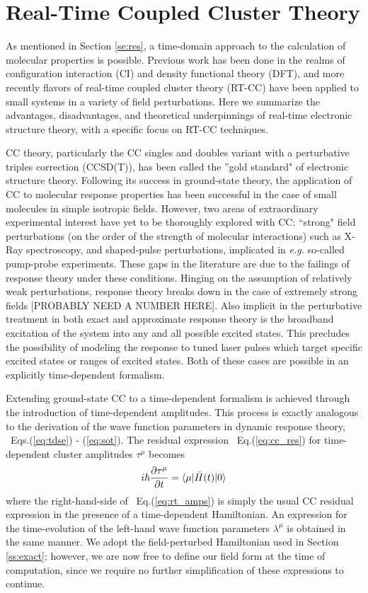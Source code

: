 \section{Real-Time Coupled Cluster Theory} \label{se:rtcc}
As mentioned in Section \ref{se:res}, a time-domain approach to the calculation of molecular properties
is possible. Previous work has been done in the realms of configuration interaction (CI) and density
functional theory (DFT), and more recently flavors of real-time coupled cluster theory (RT-CC) have been
applied to small systems in a variety of field perturbations. Here we summarize the advantages,
disadvantages, and theoretical underpinnings of real-time electronic structure theory, with a 
specific focus on RT-CC techniques.

CC theory, particularly the CC singles and doubles variant with a perturbative triples correction (CCSD(T)),
has been called the ''gold standard" of electronic structure theory. Following its success in ground-state 
theory, the application of CC to molecular response properties has been successful in the case of small 
molecules in simple isotropic fields.
However, two areas of extraordinary experimental interest have yet to be thoroughly explored with CC: 
``strong" field perturbations (on the order of the strength of molecular interactions) such as X-Ray
spectroscopy, and shaped-pulse perturbations, implicated in \textit{e.g.} so-called pump-probe experiments.
These gaps in the literature are due to the failings of response theory under these conditions. 
Hinging on the assumption of relatively weak perturbations, response theory breaks down in the case 
of extremely strong fields [PROBABLY NEED A NUMBER HERE]. Also implicit in the perturbative treatment
in both exact and approximate response theory is the broadband excitation of the system into any and 
all possible excited states. This precludes the possibility of modeling the response to tuned laser pulses
which target specific excited states or ranges of excited states. Both of these cases are possible in an
explicitly time-dependent formalism.

Extending ground-state CC to a time-dependent formalism is achieved through the introduction of 
time-dependent amplitudes. This process is exactly analogous to the derivation of the wave function
parameters in dynamic response theory, ~Eqs.(\ref{eq:tdse}) - (\ref{eq:sot}). The residual expression
~Eq.(\ref{eq:cc_res}) for time-dependent cluster amplitudes $\tau^\mu$ becomes
\begin{equation} \label{eq:rt_amps}
    i\hbar\frac{\partial\tau^\mu}{\partial t} = \langle\mu |\bar H(t)| 0 \rangle
\end{equation}
where the right-hand-side of ~Eq.(\ref{eq:rt_amps}) is simply the usual CC residual expression in the
presence of a time-dependent Hamiltonian. An expression for the time-evolution of the left-hand wave 
function parameters $\lambda^\mu$ is obtained in the same manner.
We adopt the field-perturbed Hamiltonian used in 
Section \ref{ss:exact}; however, we are now free to define our field form at the time of computation,
since we require no further simplification of these expressions to continue.

